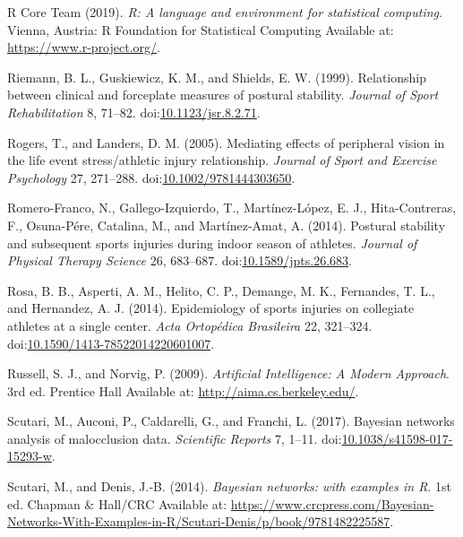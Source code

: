 \documentclass[utf8]{frontiersHLTH}
\begin{document}
\leavevmode\hypertarget{ref-RCoreTeam2019}{}%
R Core Team (2019). \emph{R: A language and environment for statistical
computing}. Vienna, Austria: R Foundation for Statistical Computing
Available at: \url{https://www.r-project.org/}.

\leavevmode\hypertarget{ref-Riemann1999d}{}%
Riemann, B. L., Guskiewicz, K. M., and Shields, E. W. (1999).
Relationship between clinical and forceplate measures of postural
stability. \emph{Journal of Sport Rehabilitation} 8, 71--82.
doi:\href{https://doi.org/10.1123/jsr.8.2.71}{10.1123/jsr.8.2.71}.

\leavevmode\hypertarget{ref-Rogers2005}{}%
Rogers, T., and Landers, D. M. (2005). Mediating effects of peripheral
vision in the life event stress/athletic injury relationship.
\emph{Journal of Sport and Exercise Psychology} 27, 271--288.
doi:\href{https://doi.org/10.1002/9781444303650}{10.1002/9781444303650}.

\leavevmode\hypertarget{ref-Romero-Franco2014}{}%
Romero-Franco, N., Gallego-Izquierdo, T., Martínez-López, E. J.,
Hita-Contreras, F., Osuna-Pére, Catalina, M., and Martínez-Amat, A.
(2014). Postural stability and subsequent sports injuries during indoor
season of athletes. \emph{Journal of Physical Therapy Science} 26,
683--687.
doi:\href{https://doi.org/10.1589/jpts.26.683}{10.1589/jpts.26.683}.

\leavevmode\hypertarget{ref-Rosa2014}{}%
Rosa, B. B., Asperti, A. M., Helito, C. P., Demange, M. K., Fernandes,
T. L., and Hernandez, A. J. (2014). Epidemiology of sports injuries on
collegiate athletes at a single center. \emph{Acta Ortopédica
Brasileira} 22, 321--324.
doi:\href{https://doi.org/10.1590/1413-78522014220601007}{10.1590/1413-78522014220601007}.

\leavevmode\hypertarget{ref-Norvig2009}{}%
Russell, S. J., and Norvig, P. (2009). \emph{Artificial Intelligence: A
Modern Approach}. 3rd ed. Prentice Hall Available at:
\url{http://aima.cs.berkeley.edu/}.

\leavevmode\hypertarget{ref-Scutari2017}{}%
Scutari, M., Auconi, P., Caldarelli, G., and Franchi, L. (2017).
Bayesian networks analysis of malocclusion data. \emph{Scientific
Reports} 7, 1--11.
doi:\href{https://doi.org/10.1038/s41598-017-15293-w}{10.1038/s41598-017-15293-w}.

\leavevmode\hypertarget{ref-Scutari2014}{}%
Scutari, M., and Denis, J.-B. (2014). \emph{Bayesian networks: with
examples in R}. 1st ed. Chapman \& Hall/CRC Available at:
\url{https://www.crcpress.com/Bayesian-Networks-With-Examples-in-R/Scutari-Denis/p/book/9781482225587}.
\end{document}

